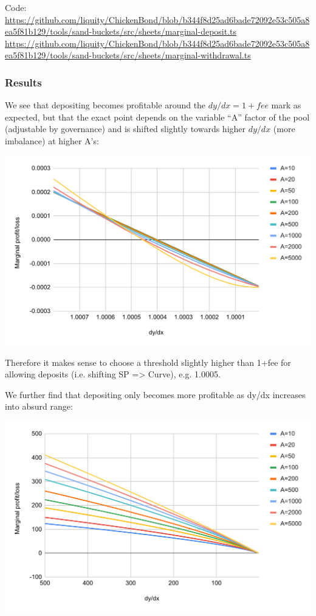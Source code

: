 \documentclass{article}
\begin{document}
Code:
\url{https://github.com/liquity/ChickenBond/blob/b344f8d25ad6bade72092e53c505a8ea5f81b129/tools/sand-buckets/src/sheets/marginal-deposit.ts}
\url{https://github.com/liquity/ChickenBond/blob/b344f8d25ad6bade72092e53c505a8ea5f81b129/tools/sand-buckets/src/sheets/marginal-withdrawal.ts}

\subsubsection{Results}

We see that depositing becomes profitable around the $dy/dx = 1+fee$ mark as expected, but that the exact point depends on the variable “A” factor of the pool (adjustable by governance) and is shifted slightly towards higher $dy/dx$ (more imbalance) at higher A’s:

\includegraphics[width=\linewidth]{./LUSDChickenBonds_Shifting_Profitability_1.png}

Therefore it makes sense to choose a threshold slightly higher than 1+fee for allowing deposits (i.e. shifting SP => Curve), e.g. 1.0005.

We further find that depositing only becomes more profitable as dy/dx increases into absurd range:

\includegraphics[width=\linewidth]{./LUSDChickenBonds_Shifting_Profitability_2.png}
\end{document}
